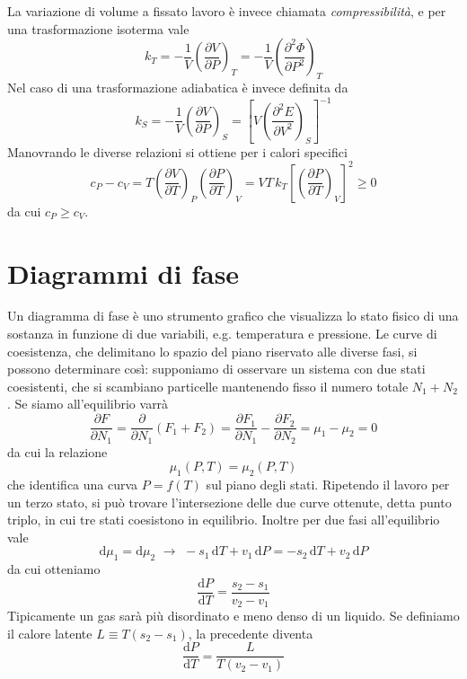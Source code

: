 \documentclass[a4paper]{report}
\begin{document}
La variazione di volume a fissato lavoro è invece chiamata \textit{compressibilità}, e per una trasformazione isoterma vale
\begin{equation}
    k_T = -\frac{1}{V}\left(\frac{\partial V}{\partial P }\right)_T = -\frac{1}{V}\left(\frac{\partial^2 \Phi }{\partial P^2 }\right)_T  
\end{equation}
Nel caso di una trasformazione adiabatica è invece definita da
\begin{equation}
    k_S = -\frac{1}{V}\left(\frac{\partial V}{\partial P }\right)_S = \left[V\left(\frac{\partial^2 E }{\partial V^2 }\right)_S\right]^{-1}
\end{equation}
Manovrando le diverse relazioni si ottiene per i calori specifici 
\begin{equation}
    c_P-c_V = T\left(\frac{\partial V}{\partial T}\right)_P\left(\frac{\partial P}{\partial T}\right)_V = V T \,k_T\left[\left(\frac{\partial P}{\partial T}\right)_V\right]^2 \geq 0
\end{equation}
da cui $c_P \geq c_V$.

\section{Diagrammi di fase}

Un diagramma di fase è uno strumento grafico che visualizza lo stato fisico di una sostanza in funzione di due variabili, e.g. temperatura e pressione. Le curve di coesistenza, che delimitano lo spazio del piano riservato alle diverse fasi, si possono determinare così: supponiamo di osservare un sistema con due stati coesistenti, che si scambiano particelle mantenendo fisso il numero totale $N_1+N_2$. Se siamo all'equilibrio varrà
\begin{equation}
    \frac{\partial F}{\partial N_1} = \frac{\partial}{\partial N_1}(F_1+F_2) = \frac{\partial F_1}{\partial N_1}-\frac{\partial F_2}{\partial N_2} = \mu_1 - \mu_2 = 0
\end{equation}
da cui la relazione
\begin{equation}
 \mu_1(P,T) = \mu_2(P,T)
\end{equation}
che identifica una curva $P=f(T)$ sul piano degli stati. Ripetendo il lavoro per un terzo stato, si può trovare l'intersezione delle due curve ottenute, detta punto triplo, in cui tre stati coesistono in equilibrio. Inoltre per due fasi all'equilibrio vale
\begin{equation}
    \mathrm{d}\mu_1 = \mathrm{d}\mu_2 \,\,\rightarrow\,\, -s_1\,\mathrm{d}T +v_1 \,\mathrm{d}P = -s_2\,\mathrm{d}T +v_2 \,\mathrm{d}P 
\end{equation}
da cui otteniamo 
\begin{equation}
    \frac{\mathrm{d}P}{\mathrm{d}T} = \frac{s_2-s_1}{v_2-v_1}
\end{equation}
Tipicamente un gas sarà più disordinato e meno denso di un liquido. Se definiamo il calore latente $L \equiv T(s_2-s_1)$, la precedente diventa
\begin{equation}
    \frac{\mathrm{d}P}{\mathrm{d}T} = \frac{L}{T(v_2-v_1)}
\end{equation}
\end{document}

